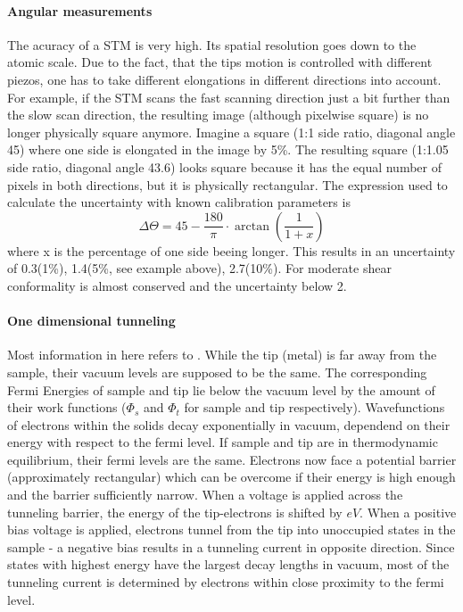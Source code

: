 \paragraph{Angular measurements} The acuracy of a STM is very high. Its spatial resolution goes down to the atomic scale. Due to the fact, that the tips motion is controlled with different piezos, one has to take different elongations in different directions into account. For example, if the STM scans the fast scanning direction just a bit further than the slow scan direction, the resulting image (although pixelwise square) is no longer physically square anymore. Imagine a square (1:1 side ratio, diagonal angle 45\textdegree) where one side is elongated in the image by 5\%. The resulting square (1:1.05 side ratio, diagonal angle 43.6\textdegree) looks square because it has the equal number of pixels in both directions, but it is physically rectangular. The expression used to calculate the uncertainty with known calibration parameters is
$$\Delta \Theta = 45 - \frac{180}{\pi}\cdot\arctan(\frac{1}{1+x})$$ where x is the percentage of one side beeing longer. This results in an uncertainty of 0.3\textdegree(1\%), 1.4\textdegree(5\%, see example above), 2.7\textdegree(10\%). For moderate shear conformality is almost conserved and the uncertainty below 2\textdegree.

\paragraph{One dimensional tunneling}
Most information in here refers to \cite{bonnell_scanning_1993}.
While the tip (metal) is far away from the sample, their vacuum levels are supposed to be the same. The corresponding Fermi Energies of sample and tip lie below the vacuum level by the amount of their work functions ($\Phi_s$ and $\Phi_t$ for sample and tip respectively). Wavefunctions of electrons within the solids decay exponentially in vacuum, dependend on their energy with respect to the fermi level.
If sample and tip are in thermodynamic equilibrium, their fermi levels are the same. Electrons now face a potential barrier (approximately rectangular) which can be overcome if their energy is high enough and the barrier sufficiently narrow. When a voltage is applied across the tunneling barrier, the energy of the tip-electrons is shifted by $eV$. When a positive bias voltage is applied, electrons tunnel from the tip into unoccupied states in the sample - a negative bias results in a tunneling current in opposite direction. Since states with highest energy have the largest decay lengths in vacuum, most of the tunneling current is determined by electrons within close proximity to the fermi level.

